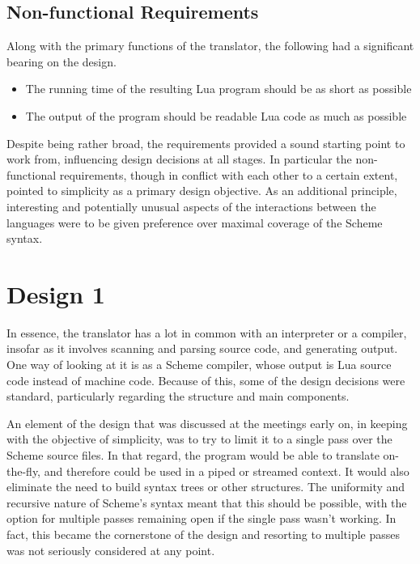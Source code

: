 \subsection{Non-functional Requirements}

Along with the primary functions of the translator, the following had a
significant bearing on the design.
\begin{itemize}
\item The running time of the resulting Lua program should be as short as
possible
\item The output of the program should be readable Lua code as much as possible
\end{itemize}

Despite being rather broad, the requirements provided a sound starting point to
work from, influencing design decisions at all stages. In particular the
non-functional requirements, though in conflict with each other to a certain
extent, pointed to simplicity as a primary design objective. As an additional
principle, interesting and potentially unusual aspects of the interactions
between the languages were to be given preference over maximal coverage of the
Scheme syntax.


\section{Design 1}

In essence, the translator has a lot in common with an interpreter or a
compiler, insofar as it involves scanning and parsing source code, and
generating output. One way of looking at it is as a Scheme compiler, whose
output is Lua source code instead of machine code. Because of this, some of the
design decisions were standard, particularly regarding the structure and main
components.

An element of the design that was discussed at the meetings early on, in keeping
with the objective of simplicity, was to try to limit it to a single pass over
the Scheme source files. In that regard, the program would be able to translate
on-the-fly, and therefore could be used in a piped or streamed context. It would
also eliminate the need to build syntax trees or other structures. The
uniformity and recursive nature of Scheme's syntax meant that this should be
possible, with the option for multiple passes remaining open if the single pass
wasn't working. In fact, this became the cornerstone of the design and resorting
to multiple passes was not seriously considered at any point.

